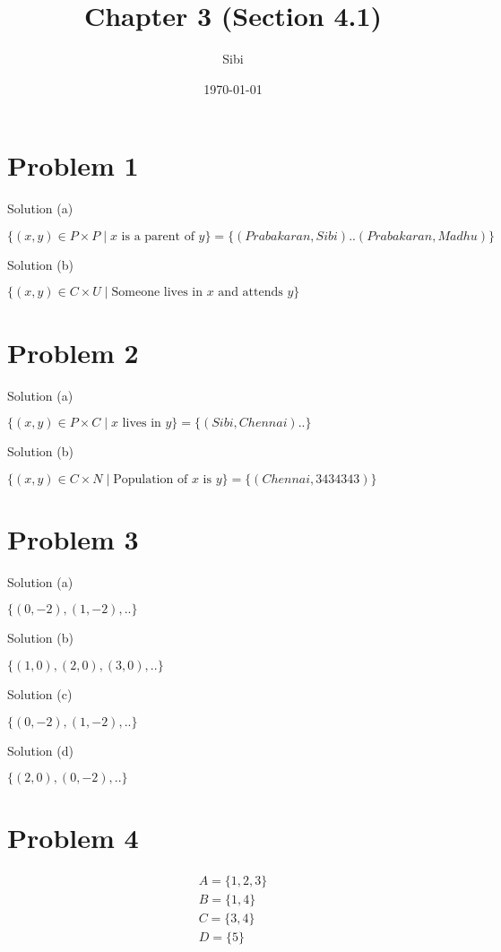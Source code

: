 \documentclass{article}
\begin{document}
\title{Chapter 3 (Section 4.1)}
\author{Sibi}
\date{\today}
\maketitle
\newpage

\section{Problem 1}

Solution (a)

$\{(x,y) \in P \times P \mid x \text{ is a parent of } y \} = \{(Prabakaran, Sibi) ..
(Prabakaran, Madhu)\}$ 

Solution (b)

$\{(x,y) \in C \times U \mid \text{Someone lives in } x \text{ and
    attends } y \}$

\section{Problem 2}

Solution (a)

$\{(x,y) \in P \times C \mid x \text{ lives in } y \} = \{(Sibi, Chennai) .. \}$

Solution (b)

$\{(x,y) \in C \times N \mid \text{Population of } x \text{ is } y \} = \{(Chennai, 3434343)\}$

\section{Problem 3}

Solution (a)

$\{(0,-2), (1,-2), ..\}$

Solution (b)

$\{(1,0), (2,0), (3,0), ..\}$

Solution (c)

$\{(0,-2), (1,-2), ..\}$

Solution (d)

$\{(2,0), (0, -2), ..\}$

\section{Problem 4}

\begin{align*}
A = \{1,2,3\} \\
B = \{1,4\} \\
C = \{3,4\} \\
D = \{5\} 
\end{align*}
\end{document}
